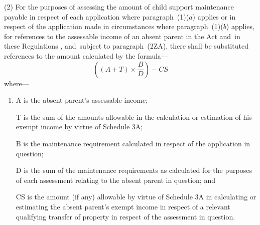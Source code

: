 \documentclass[12pt,a4paper]{article}
\begin{document}
%
%

(2) For the purposes of assessing the amount of child support maintenance payable in respect of each application where 
paragraph~(1)($a$)  %
applies
or in respect of the application made in circumstances where paragraph~(1)($b$) applies, %
for references to the assessable income of an absent parent in the Act and~in these Regulations%
, and~subject to paragraph~(2ZA),  %
there shall be substituted references to the amount calculated by the formula—
\[ \left( (A + T) \times \frac{B}{D}\right) - CS\]
where—
\begin{enumerate}\item[]
A is the absent parent’s assessable income;

T is the sum of the amounts allowable in the calculation or estimation of his exempt income by virtue of Schedule 3A;

B is the maintenance requirement calculated in respect of the application in question;

D is the sum of the maintenance requirements as calculated for the purposes of each assessment relating to the absent parent in question; and

CS is the amount (if any) allowable by virtue of Schedule 3A in calculating or estimating the absent parent’s exempt income in respect of a relevant qualifying transfer of property in respect of the assessment in question.
\end{enumerate}
\end{document}
